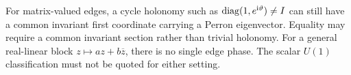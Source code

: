\begin{remark}
For matrix-valued edges, a cycle holonomy such as
\(\operatorname{diag}(1,e^{\mathrm i\vartheta})\ne I\) can still have a common
invariant first coordinate carrying a Perron eigenvector.  Equality may
require a common invariant section rather than trivial holonomy.  For a
general real-linear block \(z\mapsto az+b\overline z\), there is no
single edge phase.  The scalar \(U(1)\) classification must not be
quoted for either setting.
\end{remark}

